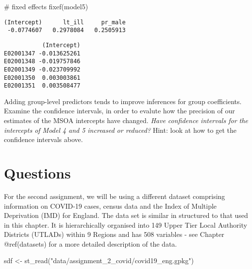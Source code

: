 \documentclass[
  letterpaper,
  krantz2]{style/krantz}
\newenvironment{Shaded}{\begin{snugshade}}{\end{snugshade}}
\newcommand{\CommentTok}[1]{\textcolor[rgb]{0.37,0.37,0.37}{#1}}
\newcommand{\DecValTok}[1]{\textcolor[rgb]{0.68,0.00,0.00}{#1}}
\newcommand{\FunctionTok}[1]{\textcolor[rgb]{0.28,0.35,0.67}{#1}}
\newcommand{\NormalTok}[1]{\textcolor[rgb]{0.00,0.23,0.31}{#1}}
\newcommand{\OtherTok}[1]{\textcolor[rgb]{0.00,0.23,0.31}{#1}}
\newcommand{\SpecialCharTok}[1]{\textcolor[rgb]{0.37,0.37,0.37}{#1}}
\newcommand{\StringTok}[1]{\textcolor[rgb]{0.13,0.47,0.30}{#1}}
\begin{document}
\begin{Shaded}
\begin{Highlighting}[]
\CommentTok{\# fixed effects}
\FunctionTok{fixef}\NormalTok{(model5)}
\end{Highlighting}
\end{Shaded}

\begin{verbatim}
(Intercept)      lt_ill     pr_male 
 -0.0774607   0.2978084   0.2505913 
\end{verbatim}

\begin{Shaded}
\end{Shaded}

\begin{verbatim}
           (Intercept)
E02001347 -0.013625261
E02001348 -0.019757846
E02001349 -0.023709992
E02001350  0.003003861
E02001351  0.003508477
\end{verbatim}

Adding group-level predictors tends to improve inferences for group
coefficients. Examine the confidence intervals, in order to evalute how
the precision of our estimates of the MSOA intercepts have changed.
\emph{Have confidence intervals for the intercepts of Model 4 and 5
increased or reduced?} Hint: look at how to get the confidence intervals
above.

\hypertarget{questions-3}{%
\section{Questions}\label{questions-3}}

For the second assignment, we will be using a different dataset
comprising information on COVID-19 cases, census data and the Index of
Multiple Deprivation (IMD) for England. The data set is similar in
structured to that used in this chapter. It is hierarchically organised
into 149 Upper Tier Local Authority Districts (UTLADs) within 9 Regions
and has 508 variables - see Chapter @ref(datasets) for a more detailed
description of the data.

\begin{Shaded}
\begin{Highlighting}[]
\NormalTok{sdf }\OtherTok{\textless{}{-}} \FunctionTok{st\_read}\NormalTok{(}\StringTok{"data/assignment\_2\_covid/covid19\_eng.gpkg"}\NormalTok{)}
\end{Highlighting}
\end{Shaded}
\end{document}
